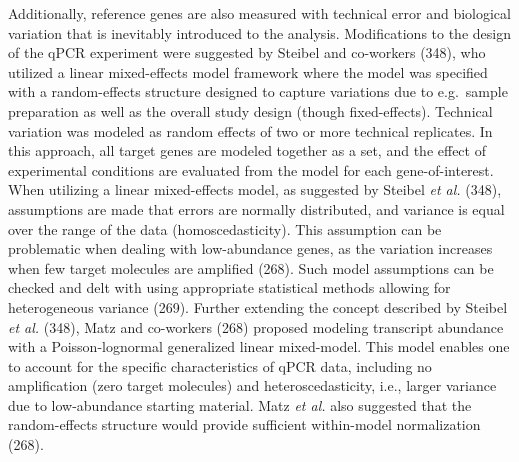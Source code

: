 \documentclass[twoside,10pt]{gihclass} %
\begin{document}
Additionally, reference genes are also measured with technical error and biological variation that is inevitably introduced to the analysis.
Modifications to the design of the qPCR experiment were suggested by Steibel and co-workers (348), who utilized a linear mixed-effects model framework where the model was specified with a random-effects structure designed to capture variations due to e.g.~sample preparation as well as the overall study design (though fixed-effects).
Technical variation was modeled as random effects of two or more technical replicates.
In this approach, all target genes are modeled together as a set, and the effect of experimental conditions are evaluated from the model for each gene-of-interest.
When utilizing a linear mixed-effects model, as suggested by Steibel \emph{et al.} (348), assumptions are made that errors are normally distributed, and variance is equal over the range of the data (homoscedasticity).
This assumption can be problematic when dealing with low-abundance genes, as the variation increases when few target molecules are amplified (268).
Such model assumptions can be checked and delt with using appropriate statistical methods allowing for heterogeneous variance (269).
Further extending the concept described by Steibel \emph{et al.} (348), Matz and co-workers (268) proposed modeling transcript abundance with a Poisson-lognormal generalized linear mixed-model. This model enables one to account for the specific characteristics of qPCR data, including no amplification (zero target molecules) and heteroscedasticity, i.e., larger variance due to low-abundance starting material.
Matz \emph{et al.} also suggested that the random-effects structure would provide sufficient within-model normalization (268).
\end{document}
